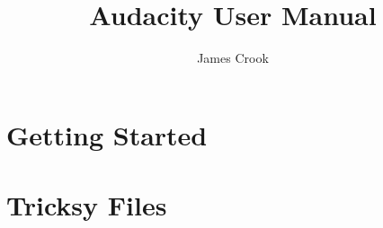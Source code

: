 \documentclass[openany]{book}
\begin{document}
{\let\cleardoublepage\clearpage 
\title{Audacity User Manual}
\author{James Crook}
}

\chapter{Getting Started}

\label{XXX}









\chapter{Tricksy Files}
%
\end{document}
